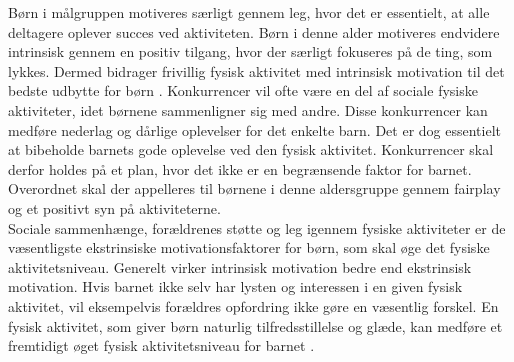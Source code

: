 Børn i målgruppen motiveres særligt gennem leg, hvor det er essentielt, at alle deltagere oplever succes ved aktiviteten. Børn i denne alder motiveres endvidere intrinsisk gennem en positiv tilgang, hvor der særligt fokuseres på de ting, som lykkes. Dermed bidrager frivillig fysisk aktivitet med intrinsisk motivation til det bedste udbytte for børn \citep{J.Sebire2013}. Konkurrencer vil ofte være en del af sociale fysiske aktiviteter, idet børnene sammenligner sig med andre. Disse konkurrencer kan medføre nederlag og dårlige oplevelser for det enkelte barn. Det er dog essentielt at bibeholde barnets gode oplevelse ved den fysisk aktivitet. Konkurrencer skal derfor holdes på et plan, hvor det ikke er en begrænsende faktor for barnet. Overordnet skal der appelleres til børnene i denne aldersgruppe gennem fairplay og et positivt syn på aktiviteterne. \citep{Wied2011}\\
Sociale sammenhænge, forældrenes støtte og leg igennem fysiske aktiviteter er de væsentligste ekstrinsiske motivationsfaktorer for børn, som skal øge det fysiske aktivitetsniveau. Generelt virker intrinsisk motivation bedre end ekstrinsisk motivation. Hvis barnet ikke selv har lysten og interessen i en given fysisk aktivitet, vil eksempelvis forældres opfordring ikke gøre en væsentlig forskel. \citep{J.Sebire2013,McWhorter2003} En fysisk aktivitet, som giver børn naturlig tilfredsstillelse og glæde, kan medføre et fremtidigt øget fysisk aktivitetsniveau for barnet \citep{Romani2013}.
